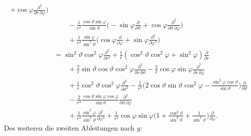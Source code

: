 \begin{align*}
+\cos\varphi \frac{\partial^2}{\partial r\,\partial\varphi}
\biggr)
\\
&\qquad
-\frac1{r^2}
\frac{ \cos\vartheta \sin\varphi }{\sin\vartheta}\biggl(
-\sin\varphi\frac{\partial}{\partial\vartheta}
+\cos\varphi\frac{\partial^2}{\partial\vartheta\,\partial\varphi}
\biggr)
\\
&\qquad
+\frac1{r^2}\frac{\sin\varphi}{\sin^2\vartheta}\biggl(
\cos\varphi\frac{\partial}{\partial\varphi}
+\sin\varphi\frac{\partial^2}{\partial\varphi^2}
\biggr)
\\
&=
\sin^2\vartheta\cos^2\varphi \frac{\partial^2}{\partial r^2}
+
\frac1r( \cos^2\vartheta\cos^2\varphi + \sin^2\varphi)
\frac{\partial}{\partial r}
\\
&\qquad
+
\frac{2}r\sin\vartheta\cos\vartheta\cos^2\varphi
\frac{\partial^2}{\partial r\,\partial\vartheta}
-
\frac2r\cos\varphi\sin\varphi
\frac{\partial^2}{\partial r\,\partial\varphi}
\\
&\qquad
+
\frac1r\cos^2\vartheta\cos^2\varphi \frac{\partial^2}{\partial \vartheta^2}
-
\frac1{r^2}\biggl(
2\cos\vartheta\sin\vartheta\cos^2\varphi
-\frac{\sin^2\varphi\cos\vartheta}{\sin\vartheta}
\biggr)
\frac{\partial}{\partial\vartheta}
\\
&\qquad
-
\frac2{r^2}\frac{ \cos\vartheta \sin\varphi \cos\varphi }{\sin\vartheta}
\frac{\partial^2}{\partial \vartheta\,\partial\varphi}
\\
&\qquad
+
\frac1{r^2}\frac{\sin^2\varphi}{\sin^2\vartheta}
\frac{\partial^2}{\partial \varphi^2}
+
\frac1{r^2}\cos\varphi\sin\varphi\biggl(
1+\frac{\cos^2\vartheta}{\sin^2\vartheta}
+
\frac1{\sin^2\vartheta}
\biggr)
\frac{\partial}{\partial\varphi}.
\end{align*}
Des weiteren die zweiten Ableitungen nach $y$:
